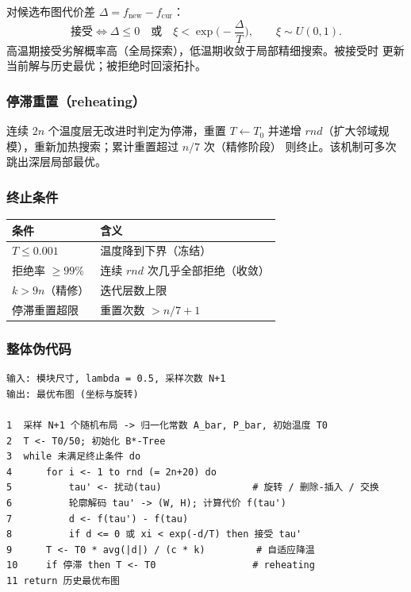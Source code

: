 \documentclass[12pt,a4paper]{article}
\begin{document}
对候选布图代价差 $\Delta = f_{\text{new}} - f_{\text{cur}}$：
\begin{equation}
\text{接受} \iff \Delta \le 0 \quad \text{或} \quad
\xi < \exp\!\Big(-\frac{\Delta}{T}\Big), \qquad \xi \sim U(0,1).
\end{equation}
高温期接受劣解概率高（全局探索），低温期收敛于局部精细搜索。被接受时
更新当前解与历史最优；被拒绝时回滚拓扑。

\subsubsection{停滞重置（reheating）}

连续 $2n$ 个温度层无改进时判定为停滞，重置 $T \leftarrow T_0$ 并递增
$rnd$（扩大邻域规模），重新加热搜索；累计重置超过 $n/7$ 次（精修阶段）
则终止。该机制可多次跳出深层局部最优。

\subsubsection{终止条件}

\begin{table}[H]
\centering
\small
\begin{tabular}{ll}
\toprule
条件 & 含义 \\
\midrule
$T \le 0.001$ & 温度降到下界（冻结） \\
拒绝率 $\ge 99\%$ & 连续 $rnd$ 次几乎全部拒绝（收敛） \\
$k > 9n$（精修） & 迭代层数上限 \\
停滞重置超限 & 重置次数 $> n/7 + 1$ \\
\bottomrule
\end{tabular}
\end{table}

\subsubsection{整体伪代码}

\begin{tcolorbox}[colback=blue!5, colframe=blue!60, title=算法 1：B$^*$ 树 + 快速模拟退火]
{\small
\begin{verbatim}
输入: 模块尺寸, lambda = 0.5, 采样次数 N+1
输出: 最优布图 (坐标与旋转)

1  采样 N+1 个随机布局 -> 归一化常数 A_bar, P_bar, 初始温度 T0
2  T <- T0/50; 初始化 B*-Tree
3  while 未满足终止条件 do
4      for i <- 1 to rnd (= 2n+20) do
5          tau' <- 扰动(tau)                # 旋转 / 删除-插入 / 交换
6          轮廓解码 tau' -> (W, H); 计算代价 f(tau')
7          d <- f(tau') - f(tau)
8          if d <= 0 或 xi < exp(-d/T) then 接受 tau'
9      T <- T0 * avg(|d|) / (c * k)         # 自适应降温
10     if 停滞 then T <- T0                 # reheating
11 return 历史最优布图
\end{verbatim}
}
\end{tcolorbox}
\end{document}
